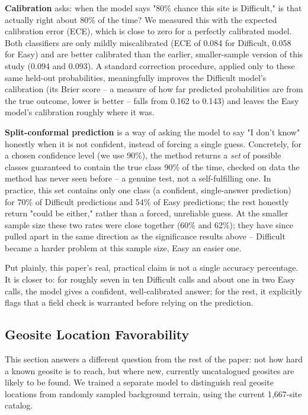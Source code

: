 \documentclass[11pt,a4paper]{article}
\begin{document}
\textbf{Calibration} asks: when the model says "80\% chance this site is Difficult," is that actually right about 80\% of the time? We measured this with the expected calibration error (ECE), which is close to zero for a perfectly calibrated model. Both classifiers are only mildly miscalibrated (ECE of 0.084 for Difficult, 0.058 for Easy) and are better calibrated than the earlier, smaller-sample version of this study (0.094 and 0.093). A standard correction procedure, applied only to these same held-out probabilities, meaningfully improves the Difficult model's calibration (its Brier score -- a measure of how far predicted probabilities are from the true outcome, lower is better -- falls from 0.162 to 0.143) and leaves the Easy model's calibration roughly where it was.

\textbf{Split-conformal prediction} is a way of asking the model to say "I don't know" honestly when it is not confident, instead of forcing a single guess. Concretely, for a chosen confidence level (we use 90\%), the method returns a \emph{set} of possible classes guaranteed to contain the true class 90\% of the time, checked on data the method has never seen before -- a genuine test, not a self-fulfilling one. In practice, this set contains only one class (a confident, single-answer prediction) for 70\% of Difficult predictions and 54\% of Easy predictions; the rest honestly return "could be either," rather than a forced, unreliable guess. At the smaller sample size these two rates were close together (60\% and 62\%); they have since pulled apart in the same direction as the significance results above -- Difficult became a harder problem at this sample size, Easy an easier one.

Put plainly, this paper's real, practical claim is not a single accuracy percentage. It is closer to: for roughly seven in ten Difficult calls and about one in two Easy calls, the model gives a confident, well-calibrated answer; for the rest, it explicitly flags that a field check is warranted before relying on the prediction.

\subsection{Geosite Location Favorability}
\label{sec:favorability}
This section answers a different question from the rest of the paper: not how hard a known geosite is to reach, but where new, currently uncatalogued geosites are likely to be found. We trained a separate model to distinguish real geosite locations from randomly sampled background terrain, using the current 1{,}667-site catalog.
\end{document}
